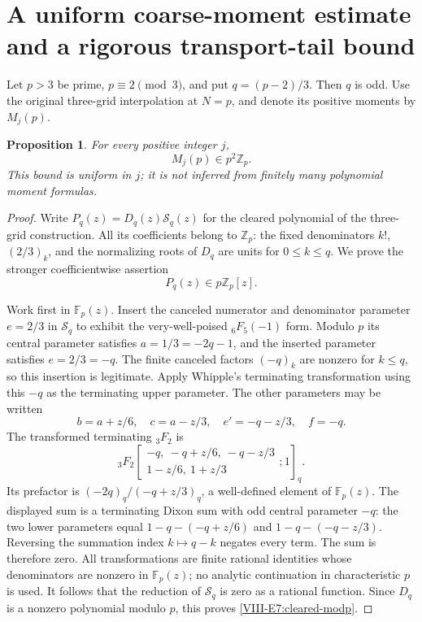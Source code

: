 \documentclass[11pt,letterpaper]{article}
\newtheorem{proposition}[theorem]{Proposition}
\numberwithin{equation}{section}
\begin{document}
\section{A uniform coarse-moment estimate and a rigorous transport-tail bound}\label{loc-VIII-17}
\label{VIII-sec:E7coarsemoments}
Let $p>3$ be prime, $p\equiv2\pmod3$, and put $q=(p-2)/3$.
Then $q$ is odd. Use the original three-grid interpolation at
$N=p$, and denote its positive moments by $M_j(p)$.

\begin{proposition}\label{VIII-E7:all-coarse-moments}
For every positive integer $j$,
\[
 \boxed{M_j(p)\in p^2\mathbb Z_p.}
\]
This bound is uniform in $j$; it is not inferred from finitely many
polynomial moment formulas.
\end{proposition}
\begin{proof}
Write $P_q(z)=D_q(z)\mathcal S_q(z)$ for the cleared polynomial
of the three-grid construction. All its coefficients belong to
$\mathbb Z_p$: the fixed denominators $k!$, $(2/3)_k$, and the
normalizing roots of $D_q$ are units for $0\le k\le q$.
We prove the stronger coefficientwise assertion
\begin{equation}\label{VIII-E7:cleared-modp}
 P_q(z)\in p\mathbb Z_p[z].
\end{equation}

Work first in $\mathbb F_p(z)$. Insert the canceled numerator and
denominator parameter $e=2/3$ in $\mathcal S_q$ to exhibit the
very-well-poised ${}_6F_5(-1)$ form.
Modulo $p$ its central parameter satisfies
$a=1/3=-2q-1$, and the inserted parameter satisfies $e=2/3=-q$.
The finite canceled factors $(-q)_k$ are nonzero for $k\le q$,
so this insertion is legitimate.
Apply Whipple's terminating transformation using this $-q$ as the
terminating upper parameter. The other parameters may be written
\[
 b=a+z/6,\quad c=a-z/3,\quad e'=-q-z/3,\quad f=-q.
\]
The transformed terminating ${}_3F_2$ is
\[
 {}_3F_2\left[\begin{matrix}
 -q,\ -q+z/6,\ -q-z/3\\1-z/6,\ 1+z/3
 \end{matrix};1\right]_q.
\]
Its prefactor is $(-2q)_q/(-q+z/3)_q$, a well-defined element of
$\mathbb F_p(z)$. The displayed sum is a terminating Dixon sum
with odd central parameter $-q$: the two lower parameters equal
$1-q-(-q+z/6)$ and $1-q-(-q-z/3)$.
Reversing the summation index $k\mapsto q-k$ negates every term.
The sum is therefore zero. All transformations are finite rational
identities whose denominators are nonzero in $\mathbb F_p(z)$;
no analytic continuation in characteristic $p$ is used.
It follows that the reduction of $\mathcal S_q$ is zero as a
rational function. Since $D_q$ is a nonzero polynomial modulo $p$,
this proves \eqref{VIII-E7:cleared-modp}.


\end{proof}
\end{document}
